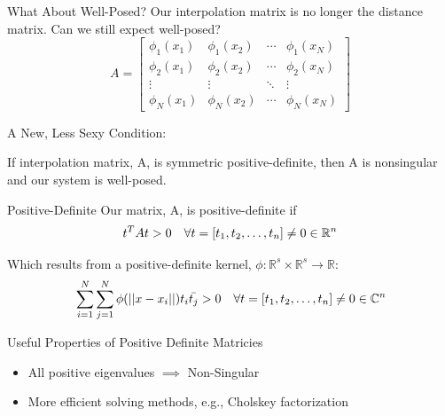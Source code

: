 \documentclass[12pt,t]{beamer}
\newcommand{\bi}{\begin{itemize}}
\newcommand{\ei}{\end{itemize}}
\newcommand{\subt}[1]{{\footnotesize \color{subtitle} {#1}}}
\begin{document}
\begin{frame}{What About Well-Posed?}
Our interpolation matrix is no longer the distance matrix. Can we still expect well-posed?
\begin{equation*}
A=
\begin{bmatrix}
\phi_1(x_1) & \phi_1(x_2) & \cdots & \phi_1(x_N)\\
\phi_2(x_1) & \phi_2(x_2)& \cdots & \phi_2(x_N)\\
\vdots & \vdots & \ddots & \vdots\\
\phi_N(x_1) & \phi_N(x_2)& \cdots & \phi_N(x_N)
\end{bmatrix}
\end{equation*}
\pause

\subt{A New, Less Sexy Condition:}

If interpolation matrix, A, is symmetric \subt{positive-definite}, then A is nonsingular and our system is well-posed.

\note{}
\end{frame}

\begin{frame}{Positive-Definite}
Our matrix, A, is \subt{positive-definite} if
\begin{align*}
& t^TAt>0 & \forall t=\left[ t_1, t_2, \mathellipsis, t_n\right]\neq 0 \in \mathbb{R}^n
\end{align*}

Which results from a \subt{positive-definite} kernel, $\phi: \mathbb{R}^s \times \mathbb{R}^s \rightarrow \mathbb{R}$:
\begin{align*}
&\sum_{i=1}^N \sum_{j=1}^N \phi(||x-x_i||)t_i\bar{t_j}>0 &\forall t=\left[ t_1, t_2, \mathellipsis, t_n\right]\neq 0 \in \mathbb{C}^n
\end{align*}

\subt{Useful Properties of Positive Definite Matricies}
\bi
\item All positive eigenvalues $\implies$ Non-Singular
\item More efficient solving methods, e.g., Cholskey factorization
\ei

\note{}
\end{frame}
\end{document}
